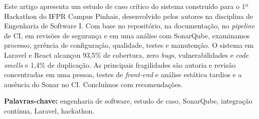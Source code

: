 \begin{abstract}
  This paper presents a critical case study of the system built for the 1st Hackathon at IFPR Campus Pinhais, developed by the authors in a Software Engineering I course. Using the repository, documentation, CI pipeline, security reviews and a SonarQube analysis, we examine process, configuration management, quality, testing and maintenance. The Laravel and React system reached 93.5\% test coverage, zero bugs, vulnerabilities and code smells, and 1.4\% duplication. The main weaknesses are authorship and review concentrated in one person, late front-end tests and static analysis, and no Sonar in the CI. We close with recommendations.
\end{abstract}

\begin{resumo}
  Este artigo apresenta um estudo de caso crítico do sistema construído para o 1º Hackathon do IFPR Campus Pinhais, desenvolvido pelos autores na disciplina de Engenharia de Software I. Com base no repositório, na documentação, no \textit{pipeline} de CI, em revisões de segurança e em uma análise com SonarQube, examinamos processo, gerência de configuração, qualidade, testes e manutenção. O sistema em Laravel e React alcançou 93,5\% de cobertura, zero \textit{bugs}, vulnerabilidades e \textit{code smells} e 1,4\% de duplicação. As principais fragilidades são autoria e revisão concentradas em uma pessoa, testes de \textit{front-end} e análise estática tardios e a ausência do Sonar no CI. Concluímos com recomendações.
\end{resumo}

\textbf{Palavras-chave:} engenharia de software, estudo de caso, SonarQube, integração contínua, Laravel, hackathon.
